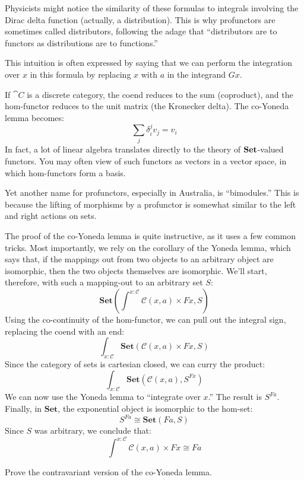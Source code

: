 \documentclass[DaoFP]{subfiles}
\begin{document}
Physicists might notice the similarity of these formulas to integrals involving the Dirac delta function (actually, a distribution). This is why profunctors are sometimes called distributors, following the adage that ``distributors are to functors as distributions are to functions.'' 

This intuition is often expressed by saying that we can perform the integration over $x$ in this formula by replacing $x$ with $a$ in the integrand $G x$. 

If $\cat C$ is a discrete category, the coend reduces to the sum (coproduct), and the hom-functor reduces to the unit matrix (the Kronecker delta). The co-Yoneda lemma becomes:
\[ \sum_j \delta_i^j v_j = v_i \]
In fact, a lot of linear algebra translates directly to the theory of $\mathbf{Set}$-valued functors. You may often view of such functors as vectors in a vector space, in which hom-functors form a basis.

Yet another name for profunctors, especially in Australia, is ``bimodules.'' This is because the lifting of morphisms by a profunctor is somewhat similar to the left and right actions on sets. 

The proof of the co-Yoneda lemma is quite instructive, as it uses a few common tricks. Most importantly, we rely on the corollary of the Yoneda lemma, which says that, if the mappings out from two objects to an arbitrary object are isomorphic, then the two objects themselves are isomorphic. We'll start, therefore, with such a mapping-out to an arbitrary set $S$:
\[ \mathbf{Set} \left(\int^{x \colon \mathcal{C}} \mathcal{C}(x, a) \times F x, S \right) \]
Using the co-continuity of the hom-functor, we can pull out the integral sign, replacing the coend with an end:
\[ \int_{x \colon \mathcal{C}} \mathbf{Set} \left( \mathcal{C}(x, a) \times F x, S \right) \]
Since the category of sets is cartesian closed, we can curry the product:
\[ \int_{x \colon \mathcal{C}} \mathbf{Set} \left( \mathcal{C}(x, a) , S^{F x} \right) \]
We can now use the Yoneda lemma to ``integrate over $x$.'' The result is $S^{F a}$. Finally, in $\mathbf{Set}$, the exponential object is isomorphic to the hom-set:
\[S^{F a} \cong \mathbf{Set}(F a, S)\]
Since $S$ was arbitrary, we conclude that:
\[ \int^{x \colon \mathcal{C}} \mathcal{C}(x, a) \times F x \cong F a \]

\begin{exercise}
Prove the contravariant version of the co-Yoneda lemma.
\end{exercise}
\end{document}
